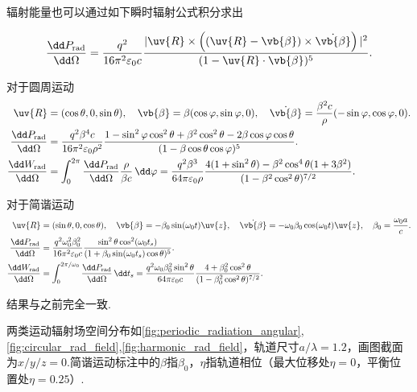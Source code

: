 \begin{note}
	辐射能量也可以通过如下瞬时辐射公式积分求出

	\begin{align*}
		\frac{\dd  P_{\mathrm{rad}}}{\dd \Omega} = \frac{q^{2}}{16\pi^{2} \varepsilon_{0} c} \frac{| \uv{R} \times \left( (\uv{R} - \vb{\beta}) \times \dot{\vb{\beta}} \right) |^{2}}{(1 - \uv{R} \cdot \vb{\beta})^{5}}.
	\end{align*}

	对于圆周运动
	\begin{align*}
		\uv{R} &= (\cos\theta, 0, \sin\theta), \quad
		\vb{\beta} = \beta (\cos\varphi, \sin\varphi, 0), \quad
		\dot{\vb{\beta}} = \frac{\beta^{2} c}{\rho} (-\sin\varphi, \cos\varphi, 0). \\
		\frac{\dd  P_{\mathrm{rad}}}{\dd \Omega} &= \frac{q^{2} \beta^{4} c}{16\pi^{2} \varepsilon_{0} \rho^{2}} \frac{1 - \sin^{2}\varphi \cos^{2}\theta + \beta^{2} \cos^{2}\theta - 2\beta \cos\varphi \cos\theta}{(1 - \beta \cos\theta \cos\varphi)^{5}}. \\
		\frac{\dd  W_{\mathrm{rad}}}{\dd \Omega} &= \int_{0}^{2\pi} \frac{\dd  P_{\mathrm{rad}}}{\dd \Omega} \frac{\rho}{\beta c} \, \dd \varphi = \frac{q^{2} \beta^{3}}{64\pi \varepsilon_{0} \rho} \frac{4(1 + \sin^{2}\theta) - \beta^{2} \cos^{4}\theta (1 + 3\beta^{2})}{(1 - \beta^{2} \cos^{2}\theta)^{7/2}}.
	\end{align*}

	对于简谐运动
	\begin{align*}
		\uv{R} &= (\sin\theta, 0, \cos\theta), \quad
		\vb{\beta} = -\beta_{0} \sin(\omega_{0} t) \uv{z}, \quad
		\dot{\vb{\beta}} = -\omega_{0} \beta_{0} \cos(\omega_{0} t) \uv{z}, \quad
		\beta_{0} = \frac{\omega_{0} a}{c}. \\
		\frac{\dd  P_{\mathrm{rad}}}{\dd \Omega} &= \frac{q^{2} \omega_{0}^{2} \beta_{0}^{2}}{16\pi^{2} \varepsilon_{0} c} \frac{\sin^{2}\theta \cos^{2}(\omega_{0} t_{s})}{(1 + \beta_{0} \sin(\omega_{0} t_{s}) \cos\theta)^{5}}. \\
		\frac{\dd  W_{\mathrm{rad}}}{\dd \Omega} &= \int_{0}^{2\pi/\omega_{0}} \frac{\dd  P_{\mathrm{rad}}}{\dd \Omega} \, \dd t_{s} = \frac{q^{2} \omega_{0} \beta_{0}^{2} \sin^{2}\theta}{64\pi \varepsilon_{0} c} \frac{4 + \beta_{0}^{2} \cos^{2}\theta}{(1 - \beta_{0}^{2} \cos^{2}\theta)^{7/2}}.
	\end{align*}

	结果与之前完全一致.

	两类运动辐射场空间分布如\cref{fig:periodic_radiation_angular},\cref{fig:circular_rad_field},\cref{fig:harmonic_rad_field}，轨道尺寸\(a/\lambda=1.2\)，画图截面为\(x/y/z=0\).简谐运动标注中的\(\beta\)指\(\beta_0\)，\(\eta\)指轨道相位（最大位移处\(\eta=0\)，平衡位置处\(\eta=0.25\)）.
\end{note}

